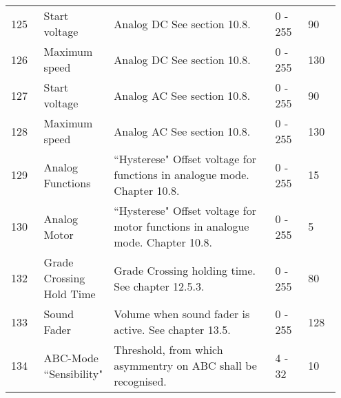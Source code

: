 \begin{tabular}{p{0.1\linewidth} p{0.15\linewidth} p{0.5\linewidth} p{0.1\linewidth} p{0.1\linewidth}}
125 & Start voltage & Analog DC See section 10.8. & 0 - 255 & 90\\
126 & Maximum speed & Analog DC See section 10.8. & 0 - 255 & 130\\
127 & Start voltage & Analog AC See section 10.8. & 0 - 255 & 90\\
128 & Maximum speed & Analog AC See section 10.8. & 0 - 255 & 130\\
129 & Analog Functions & ``Hysterese" Offset voltage for functions in analogue mode. Chapter 10.8. & 0 - 255 & 15\\
130 & Analog Motor & ``Hysterese" Offset voltage for motor functions in analogue mode. Chapter 10.8. & 0 - 255 & 5\\
132 & Grade Crossing Hold Time & Grade Crossing holding time. See chapter 12.5.3. & 0 - 255 & 80\\
133 & Sound Fader & Volume when sound fader is active. See chapter 13.5. & 0 - 255 & 128\\
134 & ABC-Mode ``Sensibility" & Threshold, from which asymmentry on ABC shall be recognised. & 4 - 32 & 10\\
\end{tabular}
